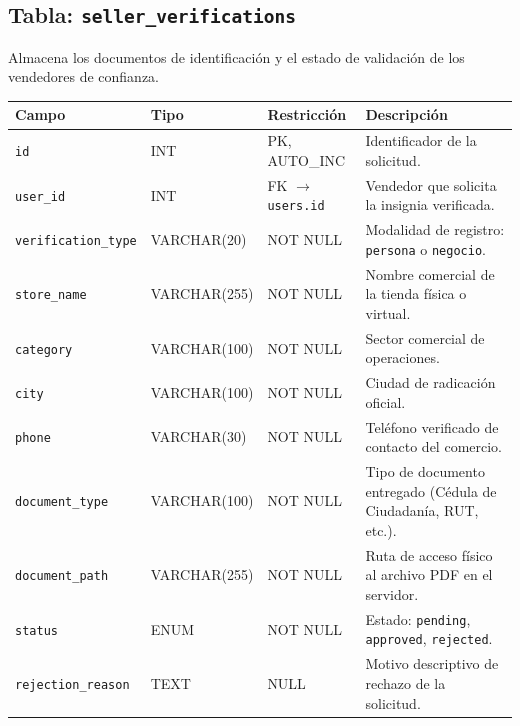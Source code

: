 \documentclass[11pt,a4paper]{report}
\begin{document}
\subsection{Tabla: \texttt{seller\_verifications}}
Almacena los documentos de identificación y el estado de validación de los vendedores de confianza.
\begin{table}[H]
\centering
\begin{tabularx}{\textwidth}{|l|l|l|L|}
\hline
{}\textbf{Campo} & \textbf{Tipo} & \textbf{Restricción} & \textbf{Descripción} \\ \hline
\texttt{id} & INT & PK, AUTO\_INC & Identificador de la solicitud. \\ \hline
\texttt{user\_id} & INT & FK $\rightarrow$ \texttt{users.id} & Vendedor que solicita la insignia verificada. \\ \hline
\texttt{verification\_type} & VARCHAR(20) & NOT NULL & Modalidad de registro: \texttt{persona} o \texttt{negocio}. \\ \hline
\texttt{store\_name} & VARCHAR(255) & NOT NULL & Nombre comercial de la tienda física o virtual. \\ \hline
\texttt{category} & VARCHAR(100) & NOT NULL & Sector comercial de operaciones. \\ \hline
\texttt{city} & VARCHAR(100) & NOT NULL & Ciudad de radicación oficial. \\ \hline
\texttt{phone} & VARCHAR(30) & NOT NULL & Teléfono verificado de contacto del comercio. \\ \hline
\texttt{document\_type} & VARCHAR(100) & NOT NULL & Tipo de documento entregado (Cédula de Ciudadanía, RUT, etc.). \\ \hline
\texttt{document\_path} & VARCHAR(255) & NOT NULL & Ruta de acceso físico al archivo PDF en el servidor. \\ \hline
\texttt{status} & ENUM & NOT NULL & Estado: \texttt{pending}, \texttt{approved}, \texttt{rejected}. \\ \hline
\texttt{rejection\_reason} & TEXT & NULL & Motivo descriptivo de rechazo de la solicitud. \\ \hline
\end{tabularx}
\end{table}
\end{document}
